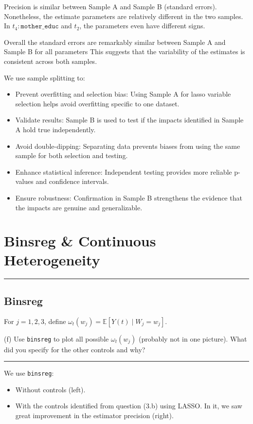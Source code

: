 \documentclass{article}
\newenvironment{colorparagraph}[1]{\par\color{#1}}{\par}
\begin{document}
Precision is similar between Sample A and Sample B (standard errors). Nonetheless, the estimate parameters are relatively different in the two samples. In $t_4:\texttt{mother\_educ}$ and $t_2$, the parameters even have different signs.

Overall the standard errors are remarkably similar between Sample A and Sample B for all parameters This suggests that the variability of the estimates is consistent across both samples.

We use sample splitting to:
\begin{itemize}
  \item Prevent overfitting and selection bias: Using Sample A for lasso variable selection helps avoid overfitting specific to one dataset.
  \item Validate results: Sample B is used to test if the impacts identified in Sample A hold true independently.
  \item Avoid double-dipping: Separating data prevents biases from using the same sample for both selection and testing.
  \item Enhance statistical inference: Independent testing provides more reliable p-values and confidence intervals.
  \item Ensure robustness: Confirmation in Sample B strengthens the evidence that the impacts are genuine and generalizable.
\end{itemize}



\begin{colorparagraph}{questioncolor}

\section*{Binsreg \& Continuous Heterogeneity}
\label{q3f}
\rule{\textwidth}{0.5pt}
\subsection{Binsreg}
For \( j = 1, 2, 3 \), define \( \omega_t(w_j) = \mathbb{E}[Y(t) \mid W_j = w_j] \).

(f) Use \texttt{binsreg} to plot all possible \( \omega_t(w_j) \) (probably not in one picture). What did you specify for the other controls and why?

\rule{\textwidth}{0.5pt}
\end{colorparagraph}

We use \texttt{binsreg}:
\begin{itemize}
  \item Without controls (left).
  \item With the controls identified from question (3.b) using LASSO. In it, we saw great improvement in the estimator precision (right).
\end{itemize}
\end{document}
